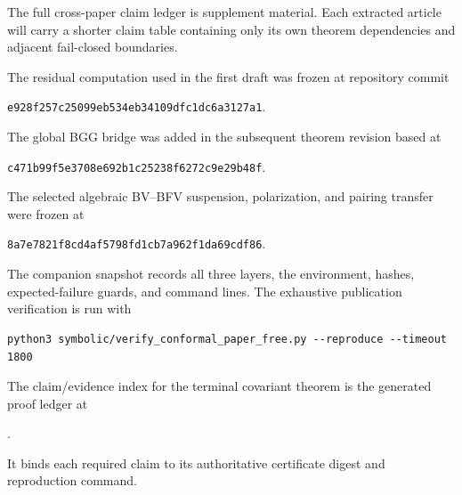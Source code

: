 \documentclass[11pt]{article}
\theoremstyle{definition}
\theoremstyle{remark}
\begin{document}
The full cross-paper claim ledger is supplement material.  Each extracted
article will carry a shorter claim table containing only its own theorem
dependencies and adjacent fail-closed boundaries.

The residual computation used in the first draft was frozen at repository
commit
\begin{center}
\texttt{e928f257c25099eb534eb34109dfc1dc6a3127a1}.
\end{center}
The global BGG bridge was added in the subsequent theorem revision based at
\begin{center}
\texttt{c471b99f5e3708e692b1c25238f6272c9e29b48f}.
\end{center}
The selected algebraic BV--BFV suspension, polarization, and pairing transfer
were frozen at
\begin{center}
\texttt{8a7e7821f8cd4af5798fd1cb7a962f1da69cdf86}.
\end{center}
The companion snapshot
records all three layers, the environment, hashes, expected-failure guards, and
command lines.  The exhaustive publication verification is run with
\begin{verbatim}
python3 symbolic/verify_conformal_paper_free.py --reproduce --timeout 1800
\end{verbatim}
The claim/evidence index for the terminal covariant theorem is the generated
proof ledger at
\begin{center}\small
{}\par
{}.
\end{center}
It binds each required claim to its authoritative certificate digest and
reproduction command.
\end{document}
